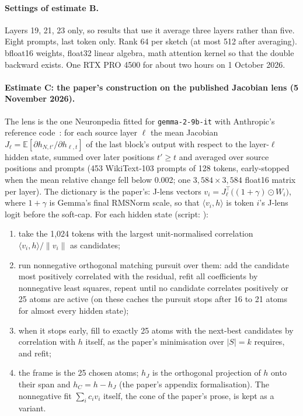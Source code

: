 \documentclass[11pt,a4paper]{article}
\newcommand{\hJ}{h_J}
\newcommand{\hC}{h_C}
\newcommand{\norm}[1]{\lVert #1 \rVert}
\begin{document}
\paragraph{Settings of estimate B.} Layers 19, 21, 23 only, so results that use it average three layers rather than five. Eight prompts, last token only. Rank 64 per sketch (at most 512 after averaging). bfloat16 weights, float32 linear algebra, math attention kernel so that the double backward exists. One RTX PRO 4500 for about two hours on 1 October 2026.

\paragraph{Estimate C: the paper's construction on the published Jacobian lens (5 November 2026).} The lens is the one Neuronpedia fitted for \texttt{gemma-2-9b-it} with Anthropic's reference code~\citep{anthropic2026jlenscode,neuronpedia2026jlens}: for each source layer $\ell$ the mean Jacobian $J_\ell=\mathbb{E}[\partial h_{N,t'}/\partial h_{\ell,t}]$ of the last block's output with respect to the layer-$\ell$ hidden state, summed over later positions $t'\ge t$ and averaged over source positions and prompts (453 WikiText-103 prompts of 128 tokens, early-stopped when the mean relative change fell below 0.002; one $3{,}584\times3{,}584$ float16 matrix per layer). The dictionary is the paper's: J-lens vectors $v_i=J_\ell^{\top}\big((1+\gamma)\odot W_i\big)$, where $1+\gamma$ is Gemma's final RMSNorm scale, so that $\langle v_i,h\rangle$ is token $i$'s J-lens logit before the soft-cap. For each hidden state (script: ):
\begin{enumerate}[leftmargin=1.6em,itemsep=0.1em]
\item take the 1,024 tokens with the largest unit-normalised correlation $\langle v_i,h\rangle/\norm{v_i}$ as candidates;
\item run nonnegative orthogonal matching pursuit over them: add the candidate most positively correlated with the residual, refit all coefficients by nonnegative least squares, repeat until no candidate correlates positively or 25 atoms are active (on these caches the pursuit stops after 16 to 21 atoms for almost every hidden state);
\item when it stops early, fill to exactly 25 atoms with the next-best candidates by correlation with $h$ itself, as the paper's minimisation over $|S|=k$ requires, and refit;
\item the frame is the 25 chosen atoms; $\hJ$ is the orthogonal projection of $h$ onto their span and $\hC=h-\hJ$ (the paper's appendix formalisation). The nonnegative fit $\sum_i c_i v_i$ itself, the cone of the paper's prose, is kept as a variant.
\end{enumerate}
\end{document}
